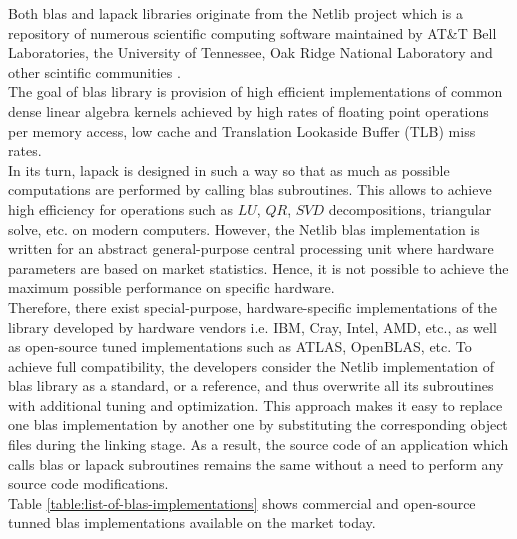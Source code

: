 Both \gls{blas} and \gls{lapack} libraries originate from the Netlib project which is a repository of numerous scientific computing software maintained by AT\&T Bell Laboratories, the University of Tennessee, Oak Ridge National Laboratory and other scintific communities \cite{netlib-overview}.\\


The goal of \gls{blas} library is provision of high efficient implementations of common dense linear algebra kernels achieved by high rates of floating point operations per memory access, low cache and Translation Lookaside Buffer (TLB) miss rates.\\


In its turn, \gls{lapack} is designed in such a way so that as much as possible computations are performed by calling \gls{blas} subroutines. This allows to achieve high efficiency for operations such as $LU$, $QR$, $SVD$ decompositions, triangular solve, etc. on modern computers. However, the Netlib \gls{blas} implementation is written for an abstract general-purpose central processing unit where hardware parameters are based on market statistics. Hence, it is not possible to achieve the maximum possible performance on specific hardware.\\


Therefore, there exist special-purpose, hardware-specific implementations of the library developed by hardware vendors i.e. IBM, Cray, Intel, AMD, etc., as well as open-source tuned implementations such as ATLAS, OpenBLAS, etc. To achieve full compatibility, the developers consider the Netlib implementation of \gls{blas} library as a standard, or a reference, and thus overwrite all its subroutines with additional tuning and optimization. This approach makes it easy to replace one \gls{blas} implementation by another one by substituting the corresponding object files during the linking stage. As a result, the source code of an application which calls \gls{blas} or \gls{lapack} subroutines remains the same without a need to perform any source code modifications.\\
 

Table \ref{table:list-of-blas-implementations} shows commercial and open-source tunned \gls{blas} implementations available on the market today.\\

